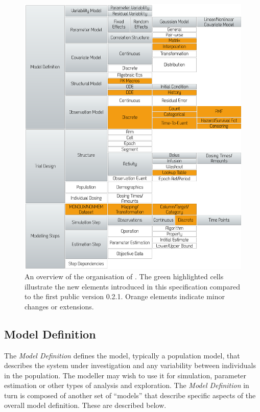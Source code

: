 \begin{figure}[htb!]
 \centering
  \includegraphics[height=0.85\textheight]{pics/PharmMLschemaOverview} %
  \caption{An overview of the organisation of \pharmml. The green highlighted cells illustrate the 
  	new elements introduced in this specification compared to the first public version 0.2.1. 
	Orange elements indicate minor changes or extensions.}
  \label{fig:momloverview}
\end{figure}

\subsection{Model Definition}

The \emph{Model Definition} defines the model, typically a population
model, that describes the system under investigation and any variability
between individuals in the population. The modeller may wish to use
it for simulation, parameter estimation or other types of analysis and
exploration. The \emph{Model Definition} in turn is composed of another
set of ``models'' that describe specific aspects of the overall model
definition. These are described below.

